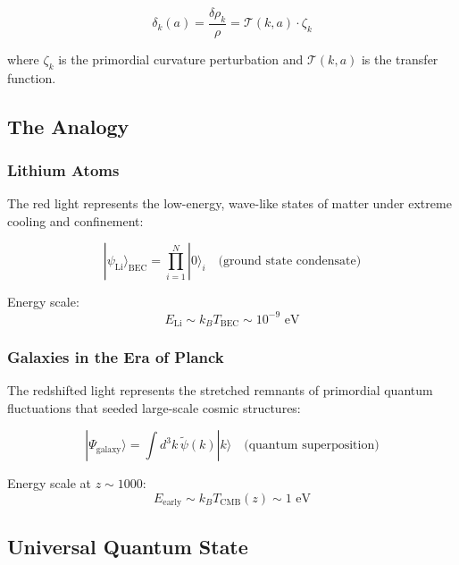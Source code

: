 \begin{equation}
\label{eq:density_perturbations}
\delta_k(a) = \frac{\delta\rho_k}{\rho} = \mathcal{T}(k,a) \cdot \zeta_k
\end{equation}

where $\zeta_k$ is the primordial curvature perturbation and $\mathcal{T}(k,a)$ is the transfer function.

\subsection{The Analogy}

\subsubsection{Lithium Atoms}

The red light represents the low-energy, wave-like states of matter under extreme cooling and confinement:

\begin{equation}
\label{eq:lithium_state}
|\psi_{\text{Li}}\rangle_{\text{BEC}} = \prod_{i=1}^N |0\rangle_i \quad \text{(ground state condensate)}
\end{equation}

Energy scale:
\begin{equation}
\label{eq:lithium_energy_scale}
E_{\text{Li}} \sim k_B T_{\text{BEC}} \sim 10^{-9} \text{ eV}
\end{equation}

\subsubsection{Galaxies in the Era of Planck}

The redshifted light represents the stretched remnants of primordial quantum fluctuations that seeded large-scale cosmic structures:

\begin{equation}
\label{eq:galaxy_state}
|\Psi_{\text{galaxy}}\rangle = \int d^3k\, \tilde{\psi}(k) |k\rangle \quad \text{(quantum superposition)}
\end{equation}

Energy scale at $z \sim 1000$:
\begin{equation}
\label{eq:galaxy_energy_scale}
E_{\text{early}} \sim k_B T_{\text{CMB}}(z) \sim 1 \text{ eV}
\end{equation}

\subsection{Universal Quantum State}

